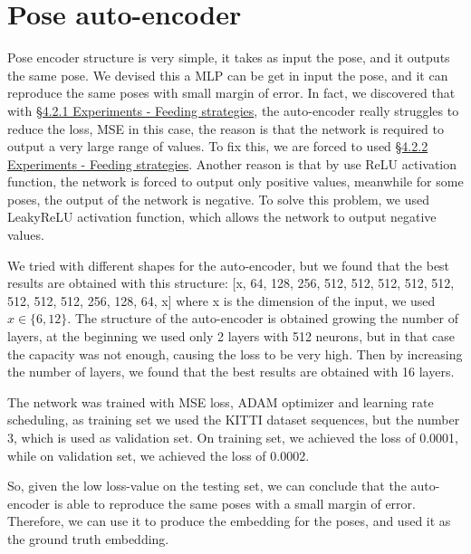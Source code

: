 \section{Pose auto-encoder}\label{sec:pose-auto-encoder}
Pose encoder structure is very simple, it takes as input the pose, and it outputs the same pose.
We devised this a MLP can be get in input the pose, and it can reproduce the same poses with small margin of error.
In fact, we discovered that with \hyperref[subsec:directly-feeding-the-sequence]{\S4.2.1 Experiments - Feeding strategies}, the auto-encoder really struggles to reduce the loss, MSE in this case, the reason is that the network is required to output a very large range of values.
To fix this, we are forced to used \hyperref[subsec:sequence-with-origin]{\S4.2.2 Experiments - Feeding strategies}.
Another reason is that by use ReLU activation function, the network is forced to output only positive values, meanwhile for some poses, the output of the network is negative.
To solve this problem, we used LeakyReLU activation function, which allows the network to output negative values.

We tried with different shapes for the auto-encoder, but we found that the best results are obtained with this structure:
[x, 64, 128, 256, 512, 512, 512, 512, 512, 512, 512, 512, 256, 128, 64,  x]
where x is the dimension of the input, we used $x \in \{6, 12\}$.
The structure of the auto-encoder is obtained growing the number of layers, at the beginning we used only 2 layers with 512 neurons, but in that case the capacity was not enough, causing the loss to be very high.
Then by increasing the number of layers, we found that the best results are obtained with 16 layers.

The network was trained with MSE loss, ADAM optimizer and learning rate scheduling, as training set we used the KITTI dataset sequences, but the number 3, which is used as validation set.
On training set, we achieved the loss of 0.0001, while on validation set, we achieved the loss of 0.0002. %

So, given the low loss-value on the testing set, we can conclude that the auto-encoder is able to reproduce the same poses with a small margin of error.
Therefore, we can use it to produce the embedding for the poses, and used it as the ground truth embedding.
